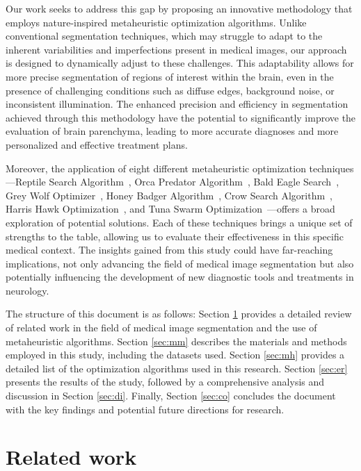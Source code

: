 \documentclass{elsarticle}
\begin{document}
Our work seeks to address this gap by proposing an innovative methodology that employs nature-inspired metaheuristic optimization algorithms. Unlike conventional segmentation techniques, which may struggle to adapt to the inherent variabilities and imperfections present in medical images, our approach is designed to dynamically adjust to these challenges. This adaptability allows for more precise segmentation of regions of interest within the brain, even in the presence of challenging conditions such as diffuse edges, background noise, or inconsistent illumination. The enhanced precision and efficiency in segmentation achieved through this methodology have the potential to significantly improve the evaluation of brain parenchyma, leading to more accurate diagnoses and more personalized and effective treatment plans.

Moreover, the application of eight different metaheuristic optimization techniques—Reptile Search Algorithm~\cite{Abualigah2022}, Orca Predator Algorithm~\cite{Jiang2022}, Bald Eagle Search~\cite{Alsattar2019}, Grey Wolf Optimizer~\cite{Mirjalili2014}, Honey Badger Algorithm~\cite{Hashim2022}, Crow Search Algorithm~\cite{Askarzadeh2016}, Harris Hawk Optimization~\cite{Heidari2019}, and Tuna Swarm Optimization~\cite{Xie2021}—offers a broad exploration of potential solutions. Each of these techniques brings a unique set of strengths to the table, allowing us to evaluate their effectiveness in this specific medical context. The insights gained from this study could have far-reaching implications, not only advancing the field of medical image segmentation but also potentially influencing the development of new diagnostic tools and treatments in neurology.

The structure of this document is as follows: Section \ref{sec:rw} provides a detailed review of related work in the field of medical image segmentation and the use of metaheuristic algorithms. Section \ref{sec:mm} describes the materials and methods employed in this study, including the datasets used. Section \ref{sec:mh} provides a detailed list of the optimization algorithms used in this research. Section \ref{sec:er} presents the results of the study, followed by a comprehensive analysis and discussion in Section \ref{sec:di}. Finally, Section \ref{sec:co} concludes the document with the key findings and potential future directions for research.

\section{Related work}\label{sec:rw}
\end{document}
